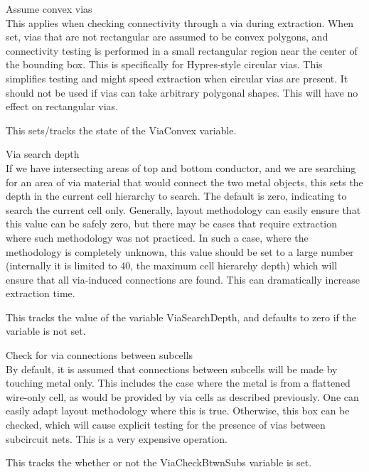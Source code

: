 \begin{description}
\item{\cb Assume convex vias}\\
This applies when checking connectivity through a via during
extraction.  When set, vias that are not rectangular are assumed to be
convex polygons, and connectivity testing is performed in a small
rectangular region near the center of the bounding box.  This is
specifically for Hypres-style circular vias.  This simplifies testing
and might speed extraction when circular vias are present.  It should
{\cb not} be used if vias can take arbitrary polygonal shapes.  This
will have no effect on rectangular vias.

This sets/tracks the state of the {\et ViaConvex} variable.

\item{\cb Via search depth}\\
If we have intersecting areas of top and bottom conductor, and we are
searching for an area of via material that would connect the two metal
objects, this sets the depth in the current cell hierarchy to search. 
The default is zero, indicating to search the current cell only. 
Generally, layout methodology can easily ensure that this value can be
safely zero, but there may be cases that require extraction where such
methodology was not practiced.  In such a case, where the methodology
is completely unknown, this value should be set to a large number
(internally it is limited to 40, the maximum cell hierarchy depth)
which will ensure that all via-induced connections are found.  This
can dramatically increase extraction time.

This tracks the value of the variable {\et ViaSearchDepth}, and
defaults to zero if the variable is not set.

\item{\cb Check for via connections between subcells}\\
By default, it is assumed that connections between subcells will be
made by touching metal only.  This includes the case where the metal
is from a flattened wire-only cell, as would be provided by via cells
as described previously.  One can easily adapt layout methodology
where this is true.  Otherwise, this box can be checked, which will
cause explicit testing for the presence of vias between subcircuit
nets.  This is a very expensive operation.

This tracks the whether or not the {\et ViaCheckBtwnSubs} variable is
set.
\end{description}

